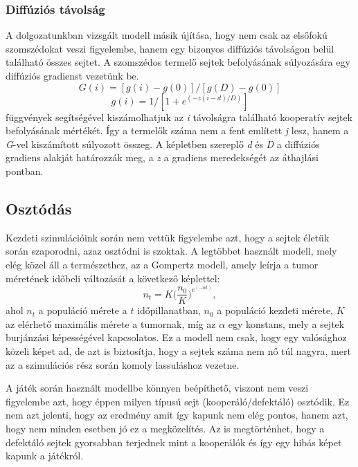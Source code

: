 \subsubsection{Diffúziós távolság}
A dolgozatunkban vizsgált modell másik újítása, hogy nem csak az elsőfokú szomszédokat veszi figyelembe, hanem egy bizonyos diffúziós távolságon belül található összes sejtet. A szomszédos termelő sejtek befolyásának súlyozására egy diffúziós gradienst vezetünk be. 
\begin{equation}
G(i) = [g(i) - g(0)]/[g(D) - g(0)] 
\end{equation}
\begin{equation}
g(i) = 1/[1 + e^{(-z(i-d)/D)}]
\end{equation}
függvények segítségével kiszámolhatjuk az \textit{i} távolságra található kooperatív sejtek befolyásának mértékét. Így a termelők száma nem a fent említett \textit{j} lesz, hanem a \textit{G}-vel kiszámított súlyozott összeg. A képletben szereplő \textit{d} és \textit{D} a diffúziós gradiens alakját határozzák meg, a \textit{z} a gradiens meredekségét az áthajlási pontban\cite{archetti2016cooperation}.

\subsection{Osztódás}
Kezdeti szimulációink során nem vettük figyelembe azt, hogy a sejtek életük során szaporodni, azaz osztódni is szoktak. A legtöbbet használt modell, mely elég közel áll a természethez, az a Gompertz modell, amely leírja a tumor méretének időbeli változását a következő képlettel:
\begin{equation}
	n_t = K \bigg(\frac{n_0}{K} \bigg) ^ {e^{(- \alpha t)}},
\end{equation}
ahol $n_t$ a populáció mérete a $t$ időpillanatban, $n_0$ a populáció kezdeti mérete, $K$ az elérhető maximális mérete a tumornak, míg az $\alpha$ egy konstans, mely a sejtek burjánzási képességével kapcsolatos\cite{wiki:gompertz}. Ez a modell nem csak, hogy egy valósághoz közeli képet ad, de azt is biztosítja, hogy a sejtek száma nem nő túl nagyra, mert az a szimulációs rész során komoly lassuláshoz vezetne. 

A játék során használt modellbe könnyen beépíthető, viszont nem veszi figyelembe azt, hogy éppen milyen típusú sejt (kooperáló/defektáló) osztódik. Ez nem azt jelenti, hogy az eredmény amit így kapunk nem elég pontos, hanem azt, hogy nem minden esetben jó ez a megközelítés. Az is megtörténhet, hogy a defektáló sejtek gyorsabban terjednek mint a kooperálók és így egy hibás képet kapunk a játékról.